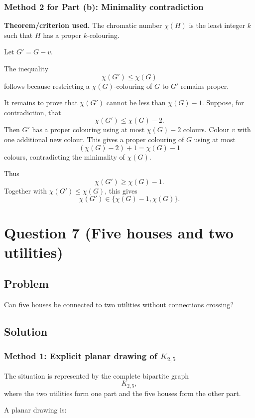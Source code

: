 \documentclass[12pt]{article}
\begin{document}
\subsubsection{Method 2 for Part (b): Minimality contradiction}
\textbf{Theorem/criterion used.} The chromatic number $\chi(H)$ is the least integer $k$ such that $H$ has a proper $k$-colouring.

Let $G'=G-v$.

The inequality
\[
\chi(G')\le \chi(G)
\]
follows because restricting a $\chi(G)$-colouring of $G$ to $G'$ remains proper.

It remains to prove that $\chi(G')$ cannot be less than $\chi(G)-1$. Suppose, for contradiction, that
\[
\chi(G')\le \chi(G)-2.
\]
Then $G'$ has a proper colouring using at most $\chi(G)-2$ colours. Colour $v$ with one additional new colour. This gives a proper colouring of $G$ using at most
\[
(\chi(G)-2)+1=\chi(G)-1
\]
colours, contradicting the minimality of $\chi(G)$.

Thus
\[
\chi(G')\ge \chi(G)-1.
\]
Together with $\chi(G')\le \chi(G)$, this gives
\[
\boxed{\chi(G')\in\{\chi(G)-1,\chi(G)\}.}
\]

\newpage
\section{Question 7 (Five houses and two utilities)}

\subsection{Problem}
Can five houses be connected to two utilities without connections crossing?

\subsection{Solution}

\subsubsection{Method 1: Explicit planar drawing of $K_{2,5}$}
The situation is represented by the complete bipartite graph
\[
K_{2,5},
\]
where the two utilities form one part and the five houses form the other part.

A planar drawing is:
\end{document}
